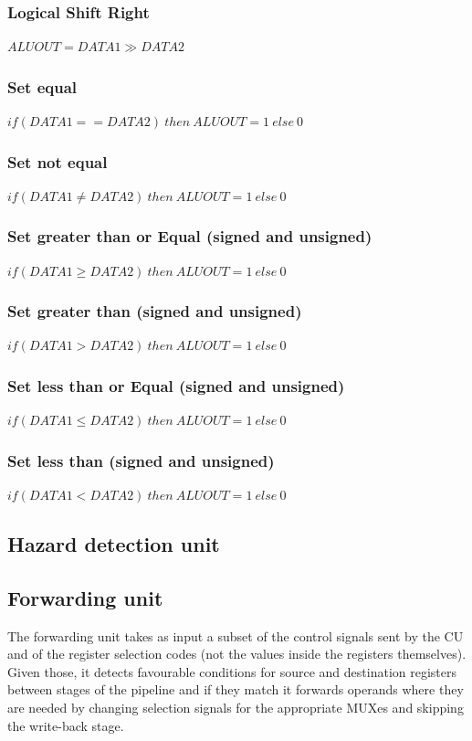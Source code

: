\subsubsection{Logical Shift Right}
$ \mathit{ALUOUT} = \mathit{DATA1} \gg \mathit{DATA2} $

\subsubsection{Set equal}
$ \mathit{if (DATA1 == DATA2) \: then} \: \mathit{ALUOUT} = 1 \: \mathit{else} \: 0 $

\subsubsection{Set not equal}
$ \mathit{if (DATA1 \neq DATA2) \: then} \: \mathit{ALUOUT} = 1 \: \mathit{else} \: 0 $

\subsubsection{Set greater than or Equal (signed and unsigned)}
$ \mathit{if (DATA1 \geq DATA2) \: then} \: \mathit{ALUOUT} = 1 \: \mathit{else} \: 0 $

\subsubsection{Set greater than (signed and unsigned)}
$ \mathit{if (DATA1 > DATA2) \: then} \: \mathit{ALUOUT} = 1 \: \mathit{else} \: 0 $

\subsubsection{Set less than or Equal (signed and unsigned)}
$ \mathit{if (DATA1 \leq DATA2) \: then} \: \mathit{ALUOUT} = 1 \: \mathit{else} \: 0 $

\subsubsection{Set less than (signed and unsigned)}
$ \mathit{if (DATA1 < DATA2) \: then} \: \mathit{ALUOUT} = 1 \: \mathit{else} \: 0 $

\subsection{Hazard detection unit}


\subsection{Forwarding unit}
The forwarding unit takes as input a subset of the control signals sent by the CU and of the register selection codes (not the values inside the registers themselves). Given those, it detects favourable conditions for source and destination registers between stages of the pipeline and if they match it forwards operands where they are needed by changing selection signals for the appropriate MUXes and skipping the write-back stage.